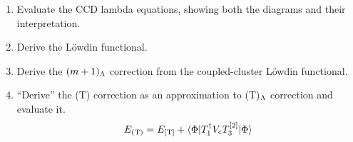\documentclass[11pt]{article}
\begin{document}
\begin{enumerate}
\item
Evaluate the CCD lambda equations, showing both the diagrams and their interpretation.

\item
Derive the L\"owdin functional.

\item
Derive the $(m+1)_{\Lambda }$ correction from the coupled-cluster L\"owdin functional.

\item
``Derive'' the (T) correction as an approximation to (T)$_{\Lambda }$ correction and evaluate it.
\begin{align}
  E_{(\mathrm{T})}
=
  E_{[\mathrm{T}]}
+
  \langle\Phi |
    T_1^\dagger
    V_{\mathrm{c}}
    T_3^{[2]}
  |\Phi \rangle
\end{align}


\end{enumerate}
\end{document}
